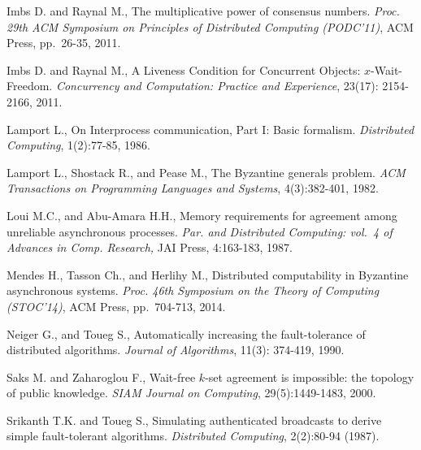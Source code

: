 \documentclass[11pt,letterpaper]{article}
\begin{document}
\begin{thebibliography}{99}
{
Imbs D. and Raynal M.,
The multiplicative power of consensus numbers.
{\it Proc.  29th ACM Symposium on Principles of Distributed Computing
(PODC'11)}, ACM Press, pp.~26-35, 2011.

Imbs D. and Raynal M.,
A Liveness Condition for Concurrent Objects: $x$-Wait-Freedom.
{\it Concurrency and Computation: Practice and Experience},
 23(17): 2154-2166, 2011.






Lamport L.,
On Interprocess communication, Part I: Basic formalism.
{\it Distributed Computing}, 1(2):77-85, 1986.


Lamport L., Shostack R., and Pease M., The Byzantine generals problem.
{\it ACM Transactions on Programming Languages and Systems},
4(3):382-401, 1982.


Loui M.C., and Abu-Amara H.H., Memory requirements for agreement
among unreliable asynchronous processes.
{\it Par. and Distributed Computing: vol.~4 of Advances
in Comp. Research,} JAI Press, 4:163-183, 1987.



Mendes H., Tasson Ch., and Herlihy M.,
Distributed computability in Byzantine asynchronous systems.
{\it Proc.  46th  Symposium on the Theory of Computing (STOC'14)},
ACM Press, pp.~704-713, 2014.

Neiger G., and Toueg S.,
Automatically increasing the fault-tolerance of distributed algorithms.
{\it Journal of  Algorithms}, 11(3): 374-419, 1990.




Saks M. and Zaharoglou F.,
Wait-free $k$-set agreement is impossible: the topology of public knowledge.
{\em SIAM Journal on Computing}, 29(5):1449-1483, 2000.

Srikanth T.K. and  Toueg S., 
Simulating authenticated broadcasts to derive simple fault-tolerant algorithms.
{\it  Distributed Computing}, 2(2):80-94  (1987).

}


\end{thebibliography}
\end{document}
